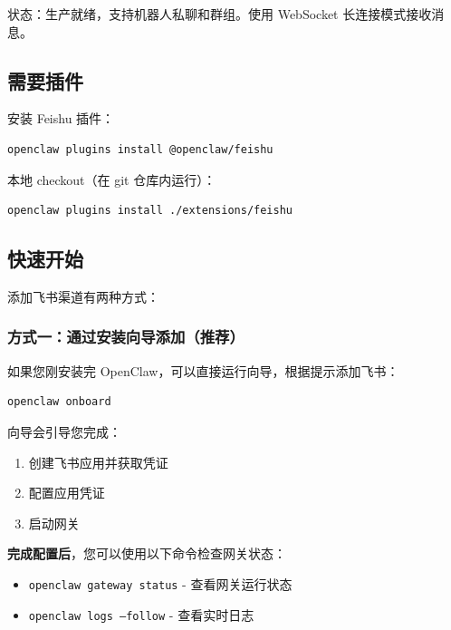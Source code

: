 状态：生产就绪，支持机器人私聊和群组。使用 WebSocket 长连接模式接收消息。

\hrulefill


\subsection{需要插件}


安装 Feishu 插件：

\begin{lstlisting}[language=bash]
openclaw plugins install @openclaw/feishu
\end{lstlisting}


本地 checkout（在 git 仓库内运行）：

\begin{lstlisting}[language=bash]
openclaw plugins install ./extensions/feishu
\end{lstlisting}


\hrulefill


\subsection{快速开始}


添加飞书渠道有两种方式：

\subsubsection{方式一：通过安装向导添加（推荐）}


如果您刚安装完 OpenClaw，可以直接运行向导，根据提示添加飞书：

\begin{lstlisting}[language=bash]
openclaw onboard
\end{lstlisting}


向导会引导您完成：

\begin{enumerate}
  \item 创建飞书应用并获取凭证
  \item 配置应用凭证
  \item 启动网关
\end{enumerate}


 \textbf{完成配置后}，您可以使用以下命令检查网关状态：

\begin{itemize}
  \item \texttt{openclaw gateway status} - 查看网关运行状态
  \item \texttt{openclaw logs --follow} - 查看实时日志
\end{itemize}


